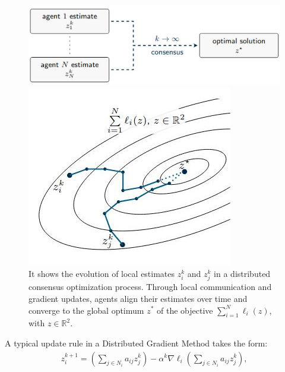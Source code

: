 \begin{figure}[h!]
    \centering
    \begin{minipage}{0.55\linewidth}
        \centering
        \includegraphics[width=\linewidth]{report/figs/consensus_optimization_1.jpg}
    \end{minipage}%
    \hfill
    \begin{minipage}{0.4\linewidth}
        \centering
        \includegraphics[width=\linewidth]{report/figs/consensus_optimization_2.jpg}
    \end{minipage}
    \caption{It shows the evolution of local estimates $z_i^k$ and $z_j^k$ in a distributed consensus optimization process. Through local communication and gradient updates, agents align their estimates over time and converge to the global optimum $z^*$ of the objective $\sum_{i=1}^N \ell_i(z)$, with $z \in \mathbb{R}^2$.}
    \label{fig:distributed_consensus_optimization}
\end{figure}

A typical update rule in a Distributed Gradient Method takes the form:
\begin{align*}
z_i^{k+1} = \left( \sum_{j \in N_i} a_{ij} z_j^k \right) - \alpha^k \nabla \ell_i\left( \sum_{j \in N_i} a_{ij} z_j^k \right),
\end{align*}

